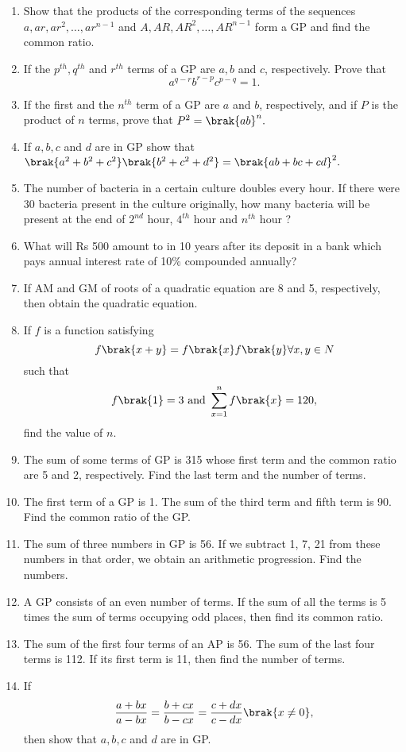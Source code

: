 \begin{enumerate}[label=\thesubsection.\arabic*.,ref=\thesubsection.\theenumi]
\item Show that the products of the corresponding terms of the sequences $a, ar, ar^2,\dots,  ar^{n-1}$ and $A, AR, AR^2,\dots,  AR^{n -1}$ form a GP  and find the common ratio.
\item If the $p^{th}, q^{th}$ and $r^{th}$ terms of a GP  are $a, b$ and $c$, respectively. Prove that 
$$a^{q-r} b^{r-p} c^{p-q} = 1.$$
\item If the first and the $n^{th}$ term of a GP  are $a$ and $b$, respectively, and if $P$ is the product of $n$ terms, prove that $P^2 = \brak{ab}^n.$
\item If $a, b, c$ and $d$ are in GP  show that $\brak{a^2 + b^2 + c^2}\brak{b^2 + c^2 + d^2} = \brak{ab + bc + cd}^2.$
\item The number of bacteria in a certain culture doubles every hour. If there were 30 bacteria present in the culture originally, how many bacteria will be present at the end of $2^{nd}$ hour, 
$4^{th}$ hour and $n^{th}$ hour ?
\item What will Rs 500 amount to in 10 years after its deposit in a bank which pays annual interest rate of 10\% compounded annually?
\item If AM  and GM  of roots of a quadratic equation are 8 and 5, respectively, then obtain the quadratic equation.
\item If $f$ is a function satisfying $$f\brak{x +y} = f\brak{x} f\brak{y} \forall x,y \in N$$ such that 
	$$f\brak{1} = 3\text{ and }\sum_{x = 1}^n f\brak{x} = 120,$$ find the value of $n$.
\item The sum of some terms of GP  is 315 whose first term and the common ratio are 5 and 2, respectively. Find the last term and the number of terms.
\item  The first term of a GP  is 1. The sum of the third term and fifth term is 90. Find the common ratio of the GP.
\item The sum of three numbers in GP  is 56. If we subtract 1, 7, 21 from these numbers in that order, we obtain an arithmetic progression. Find the numbers.
\item A GP  consists of an even number of terms. If the sum of all the terms is 5 times the sum of terms occupying odd places, then find its common ratio.
\item  The sum of the first four terms of an AP  is 56. The sum of the last four terms is 112. If its first term is 11, then find the number of terms.
\item If $$\frac{a+bx}{a-bx} = \frac{b+cx}{b-cx} = \frac{c+dx}{c-dx}\brak{x \neq 0},$$ then show that $a, b, c$ and $d$ are in GP.

\end{enumerate}
